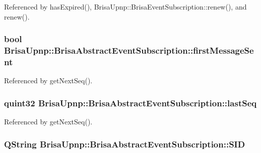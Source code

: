 Referenced by hasExpired(), BrisaUpnp::BrisaEventSubscription::renew(), and renew().\hypertarget{classBrisaUpnp_1_1BrisaAbstractEventSubscription_a82c9da7926d293e74f85e86ef039dd09}{
\subsubsection[{firstMessageSent}]{\setlength{\rightskip}{0pt plus 5cm}bool {\bf BrisaUpnp::BrisaAbstractEventSubscription::firstMessageSent}}}
\label{classBrisaUpnp_1_1BrisaAbstractEventSubscription_a82c9da7926d293e74f85e86ef039dd09}


Referenced by getNextSeq().\hypertarget{classBrisaUpnp_1_1BrisaAbstractEventSubscription_afc8085c81885cf3bcbfa670453103f2c}{
\subsubsection[{lastSeq}]{\setlength{\rightskip}{0pt plus 5cm}quint32 {\bf BrisaUpnp::BrisaAbstractEventSubscription::lastSeq}}}
\label{classBrisaUpnp_1_1BrisaAbstractEventSubscription_afc8085c81885cf3bcbfa670453103f2c}


Referenced by getNextSeq().\hypertarget{classBrisaUpnp_1_1BrisaAbstractEventSubscription_a62a26b420298aeb1b184d9b25133d6c4}{
\subsubsection[{SID}]{\setlength{\rightskip}{0pt plus 5cm}QString {\bf BrisaUpnp::BrisaAbstractEventSubscription::SID}}}
\label{classBrisaUpnp_1_1BrisaAbstractEventSubscription_a62a26b420298aeb1b184d9b25133d6c4}


